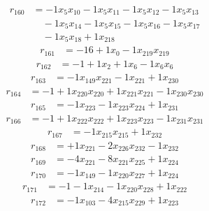 \[\begin{aligned}
r_{160} &= - 1 x_{5} x_{10} - 1 x_{5} x_{11} - 1 x_{5} x_{12} - 1 x_{5} x_{13} \\
 &\quad - 1 x_{5} x_{14} - 1 x_{5} x_{15} - 1 x_{5} x_{16} - 1 x_{5} x_{17} \\
 &\quad - 1 x_{5} x_{18} + 1 x_{218}
\end{aligned}\]
\[\begin{aligned}
r_{161} &= - 16 + 1 x_{0} - 1 x_{219} x_{219}
\end{aligned}\]
\[\begin{aligned}
r_{162} &= - 1 + 1 x_{2} + 1 x_{6} - 1 x_{6} x_{6}
\end{aligned}\]
\[\begin{aligned}
r_{163} &= - 1 x_{149} x_{221} - 1 x_{221} + 1 x_{230}
\end{aligned}\]
\[\begin{aligned}
r_{164} &= - 1 + 1 x_{220} x_{220} + 1 x_{221} x_{221} - 1 x_{230} x_{230}
\end{aligned}\]
\[\begin{aligned}
r_{165} &= - 1 x_{223} - 1 x_{223} x_{224} + 1 x_{231}
\end{aligned}\]
\[\begin{aligned}
r_{166} &= - 1 + 1 x_{222} x_{222} + 1 x_{223} x_{223} - 1 x_{231} x_{231}
\end{aligned}\]
\[\begin{aligned}
r_{167} &= - 1 x_{215} x_{215} + 1 x_{232}
\end{aligned}\]
\[\begin{aligned}
r_{168} &= + 1 x_{221} - 2 x_{226} x_{232} - 1 x_{232}
\end{aligned}\]
\[\begin{aligned}
r_{169} &= - 4 x_{221} - 8 x_{221} x_{225} + 1 x_{224}
\end{aligned}\]
\[\begin{aligned}
r_{170} &= - 1 x_{149} - 1 x_{220} x_{227} + 1 x_{224}
\end{aligned}\]
\[\begin{aligned}
r_{171} &= - 1 - 1 x_{214} - 1 x_{220} x_{228} + 1 x_{222}
\end{aligned}\]
\[\begin{aligned}
r_{172} &= - 1 x_{103} - 4 x_{215} x_{229} + 1 x_{223}
\end{aligned}\]
